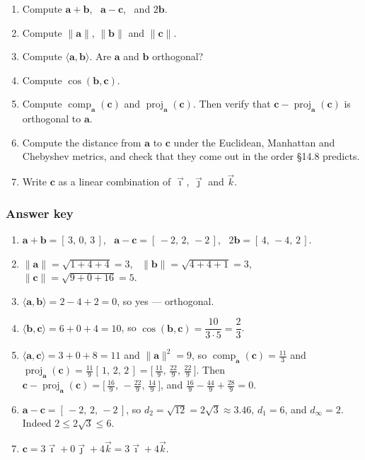 \documentclass[11pt]{article}
\theoremstyle{definition}
\theoremstyle{remark}
\newcommand{\vc}[1]{\mathbf{#1}}
\newcommand{\norm}[1]{\lVert #1\rVert}
\newcommand{\proj}[2]{\operatorname{proj}_{#1}(#2)}
\newcommand{\comp}[2]{\operatorname{comp}_{#1}(#2)}
\newcommand{\ivec}{\vec{\imath}}
\newcommand{\jvec}{\vec{\jmath}}
\newcommand{\kvec}{\vec{k}}
\begin{document}
\begin{enumerate}[label=\textbf{P\arabic*.},leftmargin=2.8em,itemsep=6pt,
                  topsep=6pt]
  \item Compute $\vc{a}+\vc{b}$, \ $\vc{a}-\vc{c}$, \ and $2\vc{b}$.
  \item Compute $\norm{\vc{a}}$, $\norm{\vc{b}}$ and $\norm{\vc{c}}$.
  \item Compute $\langle\vc{a},\vc{b}\rangle$. Are $\vc{a}$ and $\vc{b}$
        orthogonal?
  \item Compute $\cos(\vc{b},\vc{c})$.
  \item Compute $\comp{\vc{a}}{\vc{c}}$ and $\proj{\vc{a}}{\vc{c}}$. Then verify
        that $\vc{c}-\proj{\vc{a}}{\vc{c}}$ is orthogonal to $\vc{a}$.
  \item Compute the distance from $\vc{a}$ to $\vc{c}$ under the Euclidean,
        Manhattan and Chebyshev metrics, and check that they come out in the
        order \S14.8 predicts.
  \item Write $\vc{c}$ as a linear combination of $\ivec$, $\jvec$ and $\kvec$.
\end{enumerate}

\subsubsection*{Answer key}
\begin{enumerate}[label=\textbf{P\arabic*.},leftmargin=2.8em,itemsep=5pt,
                  topsep=5pt]
  \item $\vc{a}+\vc{b}=[\,3,\,0,\,3\,]$, \
        $\vc{a}-\vc{c}=[\,-2,\,2,\,-2\,]$, \
        $2\vc{b}=[\,4,\,-4,\,2\,]$.
  \item $\norm{\vc{a}}=\sqrt{1+4+4}=3$, \
        $\norm{\vc{b}}=\sqrt{4+4+1}=3$, \
        $\norm{\vc{c}}=\sqrt{9+0+16}=5$.
  \item $\langle\vc{a},\vc{b}\rangle = 2-4+2 = 0$, so yes --- orthogonal.
  \item $\langle\vc{b},\vc{c}\rangle = 6+0+4 = 10$, so
        $\cos(\vc{b},\vc{c}) = \dfrac{10}{3\cdot5} = \dfrac23$.
  \item $\langle\vc{a},\vc{c}\rangle = 3+0+8 = 11$ and $\norm{\vc{a}}^{2}=9$, so
        $\comp{\vc{a}}{\vc{c}} = \tfrac{11}{3}$ and
        $\proj{\vc{a}}{\vc{c}} = \tfrac{11}{9}[\,1,\,2,\,2\,]
         = \bigl[\,\tfrac{11}{9},\,\tfrac{22}{9},\,\tfrac{22}{9}\,\bigr]$.
        Then $\vc{c}-\proj{\vc{a}}{\vc{c}}
         = \bigl[\,\tfrac{16}{9},\,-\tfrac{22}{9},\,\tfrac{14}{9}\,\bigr]$, and
        $\tfrac{16}{9}-\tfrac{44}{9}+\tfrac{28}{9}=0$. \checkmark
  \item $\vc{a}-\vc{c}=[\,-2,\,2,\,-2\,]$, so $d_2=\sqrt{12}=2\sqrt3\approx3.46$,
        $d_1=6$, and $d_\infty=2$. Indeed $2\le2\sqrt3\le6$.
  \item $\vc{c} = 3\ivec + 0\jvec + 4\kvec = 3\ivec+4\kvec$.
\end{enumerate}
\end{document}
